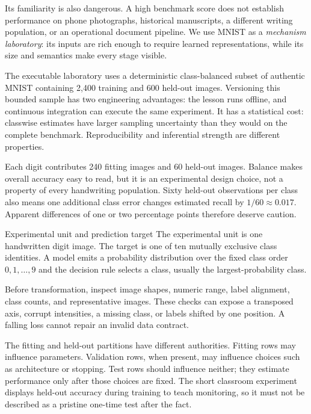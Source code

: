 Its familiarity is also dangerous. A high benchmark score does not establish
performance on phone photographs, historical manuscripts, a different
writing population, or an operational document pipeline. We use MNIST as a
\emph{mechanism laboratory}: its inputs are rich enough to require learned
representations, while its size and semantics make every stage visible.

The executable laboratory uses a deterministic class-balanced subset of
authentic MNIST containing 2,400 training and 600 held-out images. Versioning
this bounded sample has two engineering advantages: the lesson runs offline,
and continuous integration can execute the same experiment. It has a
statistical cost: classwise estimates have larger sampling uncertainty than
they would on the complete benchmark. Reproducibility and inferential strength
are different properties.

Each digit contributes 240 fitting images and 60 held-out images. Balance
makes overall accuracy easy to read, but it is an experimental design choice,
not a property of every handwriting population. Sixty held-out observations
per class also means one additional class error changes estimated recall by
$1/60\approx0.017$. Apparent differences of one or two percentage points
therefore deserve caution.

\begin{definitionbox}{Experimental unit and prediction target}
The experimental unit is one handwritten digit image. The target is one of ten
mutually exclusive class identities. A model emits a probability distribution
over the fixed class order $0,1,\ldots,9$ and the decision rule selects a class,
usually the largest-probability class.
\end{definitionbox}

Before transformation, inspect image shapes, numeric range, label alignment,
class counts, and representative images. These checks can expose a transposed
axis, corrupt intensities, a missing class, or labels shifted by one position.
A falling loss cannot repair an invalid data contract.

The fitting and held-out partitions have different authorities. Fitting rows
may influence parameters. Validation rows, when present, may influence choices
such as architecture or stopping. Test rows should influence neither; they
estimate performance only after those choices are fixed. The short classroom
experiment displays held-out accuracy during training to teach monitoring, so
it must not be described as a pristine one-time test after the fact.

